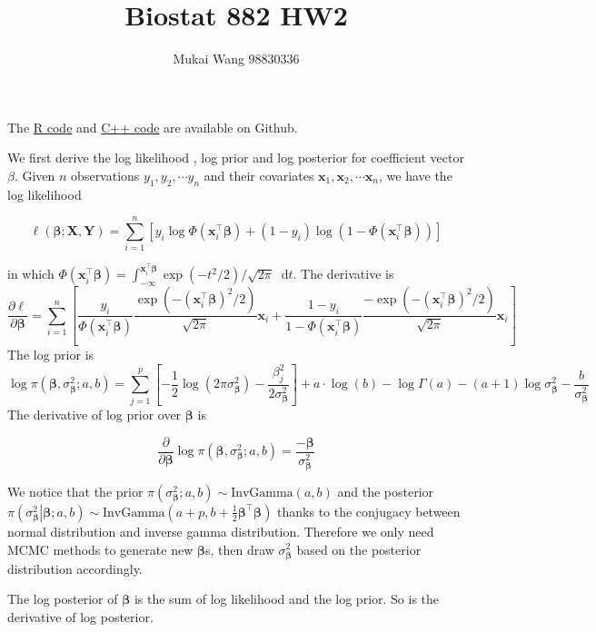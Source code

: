 \documentclass[12pt]{article}
\title{Biostat 882 HW2}
\date{}
\author{Mukai Wang 98830336}
\newcommand*\diff{\mathop{}\!\mathrm{d}}
\begin{document}
\maketitle

The \href{https://github.com/mkbwang/BIOSTAT882/blob/master/HW2/HW2code.R}{R code} and \href{https://github.com/mkbwang/BIOSTAT882/blob/master/HW2/BayesProbitReg.cpp}{C++ code} are available on Github.

We first derive the log likelihood , log prior and log posterior for coefficient vector $\beta$. Given $n$ observations $y_1, y_2, \cdots y_n$ and their covariates $\bm{x}_1, \bm{x}_2, \cdots \bm{x}_n$, we have the log likelihood

\[ \ell(\bm{\beta}; \bm{X}, \bm{Y}) = \sum_{i=1}^{n} \left[ y_i \log \Phi(\bm{x}_i^\top \bm{\beta}) + (1-y_i) \log \left(1 - \Phi(\bm{x}_i^\top \bm{\beta})\right)\right] \]

 in which $\Phi(\bm{x}_i^\top \bm{\beta}) = \int_{-\infty}^{\bm{x}_i^\top \bm{\beta}} \exp \left(-t^2 / 2 \right) / \sqrt{2\pi} \diff t$. The derivative is 
 \[\frac{\partial \ell}{\partial \bm{\beta}} = \sum_{i=1}^{n} \left[ \frac{y_i}{\Phi(\bm{x}_i^\top \bm{\beta})} \frac{\exp (-(\bm{x}_i^\top \bm{\beta})^2 / 2)}{\sqrt{2\pi}}\bm{x}_i + \frac{1-y_i}{1-\Phi(\bm{x}_i^\top \bm{\beta})} \frac{-\exp (-(\bm{x}_i^\top \bm{\beta})^2 / 2)}{\sqrt{2\pi}} \bm{x}_i \right] \]
The log prior is
\[ \log \pi(\bm{\beta}, \sigma^2_{\bm{\beta}}; a,b) = \sum_{j=1}^{p}\left[-\frac{1}{2}\log(2\pi\sigma^2_{\bm{\beta}}) - \frac{\beta^2_j}{2\sigma^2_{\bm{\beta}} } \right] + a\cdot \log(b) - \log\Gamma(a) - (a+1)\log \sigma^2_{\bm{\beta}} - \frac{b}{\sigma^2_{\bm{\beta}}} \]
The derivative of log prior over $\bm{\beta}$ is

\[ \frac{\partial}{\partial \bm{\beta}}\log \pi(\bm{\beta}, \sigma^2_{\bm{\beta}}; a,b) = \frac{-\bm{\beta}}{\sigma^2_{\bm{\beta}}} \]

We notice that the prior  $\pi\left(\sigma^2_{\bm{\beta}}; a,b\right) \sim \text{InvGamma}(a, b)$ and the posterior $\pi\left(\left. \sigma^2_{\bm{\beta}}\right\vert \bm{\beta}; a,b\right) \sim \text{InvGamma}\left(a+p, b+\frac{1}{2}\bm{\beta}^\top \bm{\beta}\right)$ thanks to the conjugacy between normal distribution and inverse gamma distribution. Therefore we only need MCMC methods to generate new $\bm{\beta}$s, then draw $\sigma^2_{\bm{\beta}}$ based on the posterior distribution accordingly.

The log posterior of $\bm{\beta}$ is the sum of log likelihood and the log prior. So is the derivative of log posterior.
\end{document}
